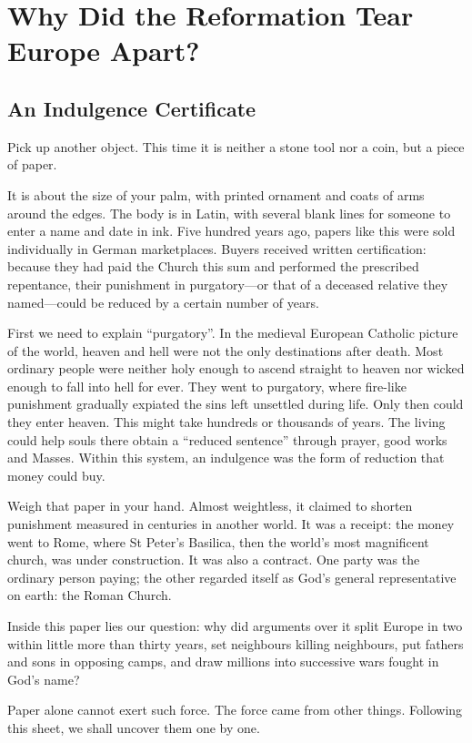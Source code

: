 \chapter[Why the Reformation Divided Europe]{Why Did the Reformation Tear Europe Apart?}
\section{An Indulgence Certificate}
Pick up another object. This time it is neither a stone tool nor a coin, but a piece of paper.

It is about the size of your palm, with printed ornament and coats of arms around the edges. The body is in Latin, with several blank lines for someone to enter a name and date in ink. Five hundred years ago, papers like this were sold individually in German marketplaces. Buyers received written certification: because they had paid the Church this sum and performed the prescribed repentance, their punishment in purgatory---or that of a deceased relative they named---could be reduced by a certain number of years.

First we need to explain ``purgatory''. In the medieval European Catholic picture of the world, heaven and hell were not the only destinations after death. Most ordinary people were neither holy enough to ascend straight to heaven nor wicked enough to fall into hell for ever. They went to purgatory, where fire-like punishment gradually expiated the sins left unsettled during life. Only then could they enter heaven. This might take hundreds or thousands of years. The living could help souls there obtain a ``reduced sentence'' through prayer, good works and Masses. Within this system, an indulgence was the form of reduction that money could buy.

Weigh that paper in your hand. Almost weightless, it claimed to shorten punishment measured in centuries in another world. It was a receipt: the money went to Rome, where St Peter's Basilica, then the world's most magnificent church, was under construction. It was also a contract. One party was the ordinary person paying; the other regarded itself as God's general representative on earth: the Roman Church.

Inside this paper lies our question: why did arguments over it split Europe in two within little more than thirty years, set neighbours killing neighbours, put fathers and sons in opposing camps, and draw millions into successive wars fought in God's name?

Paper alone cannot exert such force. The force came from other things. Following this sheet, we shall uncover them one by one.

